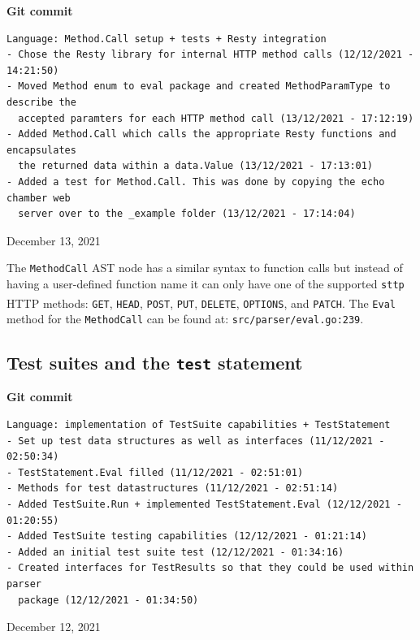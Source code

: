 \documentclass[]{full}
\theoremstyle{definition}
\begin{document}
\begin{center}
    \textbf{Git commit}
    \begin{verbatim}
Language: Method.Call setup + tests + Resty integration
- Chose the Resty library for internal HTTP method calls (12/12/2021 - 14:21:50)
- Moved Method enum to eval package and created MethodParamType to describe the
  accepted paramters for each HTTP method call (13/12/2021 - 17:12:19)
- Added Method.Call which calls the appropriate Resty functions and encapsulates
  the returned data within a data.Value (13/12/2021 - 17:13:01)
- Added a test for Method.Call. This was done by copying the echo chamber web
  server over to the _example folder (13/12/2021 - 17:14:04)
    \end{verbatim}
    \vspace{-1em}
    \tiny{December 13, 2021}
\end{center}

The \verb|MethodCall| AST node has a similar syntax to function calls but instead of having a user-defined function name it can only have one of the supported \verb|sttp| HTTP methods\textsuperscript{\cite{http_request_methods}}: \verb|GET|, \verb|HEAD|, \verb|POST|, \verb|PUT|, \verb|DELETE|, \verb|OPTIONS|, and \verb|PATCH|. The \verb|Eval| method for the \verb|MethodCall| can be found at: \verb|src/parser/eval.go:239|.

\cprotect\subsection{Test suites and the \verb|test| statement}

\begin{center}
    \textbf{Git commit}
    \begin{verbatim}
Language: implementation of TestSuite capabilities + TestStatement
- Set up test data structures as well as interfaces (11/12/2021 - 02:50:34)
- TestStatement.Eval filled (11/12/2021 - 02:51:01)
- Methods for test datastructures (11/12/2021 - 02:51:14)
- Added TestSuite.Run + implemented TestStatement.Eval (12/12/2021 - 01:20:55)
- Added TestSuite testing capabilities (12/12/2021 - 01:21:14)
- Added an initial test suite test (12/12/2021 - 01:34:16)
- Created interfaces for TestResults so that they could be used within parser
  package (12/12/2021 - 01:34:50)
    \end{verbatim}
    \vspace{-1em}
    \tiny{December 12, 2021}
\end{center}
\end{document}
